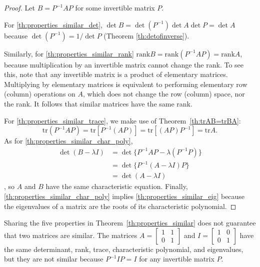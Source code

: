 \documentclass{ximera}
\begin{document}
\begin{proof}
Let $B = P^{-1}AP$ for some invertible matrix $P$. 

For \ref{th:properties_similar_det}, $\det B = \det(P^{-1}) \det A \det P = \det A$ because $\det(P^{-1}) = 1/ \det P$ (Theorem \ref{th:detofinverse}). %

Similarly, for \ref{th:properties_similar_rank} $\mbox{rank} B = \mbox{rank}(P^{-1}AP) = \mbox{rank} A$, because multiplication by an invertible matrix cannot change the rank.  To see this, note that any invertible matrix is a product of elementary matrices.  Multiplying by elementary matrices is equivalent to performing elementary row (column) operations on $A$, which does not change the row (column) space, nor the rank.  It follows that similar matrices have the same rank. 

For \ref{th:properties_similar_trace}, we make use of Theorem~\ref{th:trAB=trBA}:
\begin{equation*}
\mbox{tr} (P^{-1}AP) = \mbox{tr}[P^{-1}(AP)] = \mbox{tr}[(AP)P^{-1}] = \mbox{tr} A.
\end{equation*}
As for \ref{th:properties_similar_char_poly},
\begin{align*}
\det(B-\lambda I) &= \det \{P^{-1}AP-\lambda(P^{-1}P)\} \\
&= \det \{ P^{-1}(A-\lambda I)P\} \\
&= \det (A-\lambda I)
\end{align*}, so $A$ and $B$ have the same characteristic equation.
Finally, \ref{th:properties_similar_char_poly} implies \ref{th:properties_similar_eig} because the eigenvalues of a matrix are the roots of its characteristic polynomial.
\end{proof}

\begin{remark}\label{rem:fivePropSim}
Sharing the five properties in Theorem~\ref{th:properties_similar} does not guarantee that two matrices are similar. The matrices
$A = \begin{bmatrix}
1 & 1 \\
0 & 1
\end{bmatrix}$ and $I = \begin{bmatrix}
1 & 0 \\
0 & 1
\end{bmatrix}$ have the same determinant, rank, trace, characteristic polynomial, and eigenvalues, but they are not similar because $P^{-1}IP = I$ for any invertible matrix $P$.
\end{remark}
\end{document}
